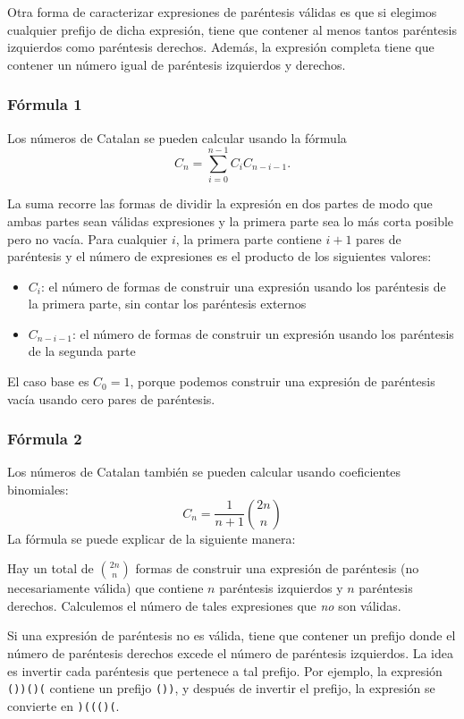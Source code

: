 Otra forma de caracterizar expresiones de paréntesis válidas
es que si
elegimos cualquier prefijo de dicha expresión,
tiene que contener al menos tantos paréntesis izquierdos
como paréntesis derechos.
Además, la expresión completa tiene que
contener un número igual de paréntesis izquierdos y derechos.

\subsubsection{Fórmula 1}

Los números de Catalan se pueden calcular usando la fórmula
\[ C_n = \sum_{i=0}^{n-1} C_{i} C_{n-i-1}.\]

La suma recorre las formas de dividir la
expresión en dos partes
de modo que ambas partes sean válidas
expresiones y la primera parte sea lo más corta posible
pero no vacía.
Para cualquier $i$, la primera parte contiene $i+1$ pares
de paréntesis y el número de expresiones
es el producto de los siguientes valores:

\begin{itemize}
\item $C_{i}$: el número de formas de construir una expresión
usando los paréntesis de la primera parte,
sin contar los paréntesis externos
\item $C_{n-i-1}$: el número de formas de construir un
expresión usando los paréntesis de la segunda parte
\end{itemize}

El caso base es $C_0=1$,
porque podemos construir una expresión de paréntesis vacía
usando cero pares de paréntesis.

\subsubsection{Fórmula 2}

Los números de Catalan también se pueden calcular
usando coeficientes binomiales:
\[ C_n = \frac{1}{n+1} {2n \choose n}\]
La fórmula se puede explicar de la siguiente manera:

Hay un total de ${2n \choose n}$ formas
de construir una expresión de paréntesis (no necesariamente válida)
que contiene $n$ paréntesis izquierdos
y $n$ paréntesis derechos.
Calculemos el número de tales
expresiones que \emph{no} son válidas.

Si una expresión de paréntesis no es válida,
tiene que contener un prefijo donde el
número de paréntesis derechos excede el
número de paréntesis izquierdos.
La idea es invertir cada paréntesis
que pertenece a tal prefijo.
Por ejemplo, la expresión
\texttt{())()(} contiene un prefijo \texttt{())},
y después de invertir el prefijo,
la expresión se convierte en \texttt{)((()(}.

